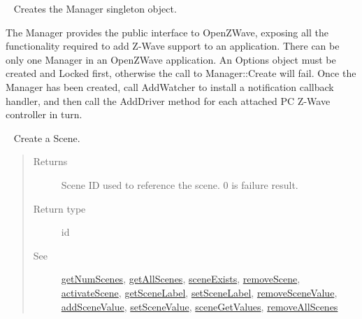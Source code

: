\documentclass[letterpaper,10pt,english]{sphinxmanual}
\begin{document}
\begin{fulllineitems}
\begin{fulllineitems}
\begin{quote}
\begin{description}
\end{description}\end{quote}

\end{fulllineitems}


\begin{fulllineitems}
\label{libopenzwave:libopenzwave.PyManager.create}~\label{libopenzwave:create}
Creates the Manager singleton object.

The Manager provides the public interface to OpenZWave, exposing all the
functionality required to add Z-Wave support to an application. There can be
only one Manager in an OpenZWave application.  An Options object must be
created and Locked first, otherwise the call to Manager::Create will fail.
Once the Manager has been created, call AddWatcher to install a notification
callback handler, and then call the AddDriver method for each attached PC
Z-Wave controller in turn.

\end{fulllineitems}


\begin{fulllineitems}
\label{libopenzwave:libopenzwave.PyManager.createScene}~\label{libopenzwave:createscene}
Create a Scene.
\begin{quote}\begin{description}
\item[{Returns}] \leavevmode
Scene ID used to reference the scene. 0 is failure result.

\item[{Return type}] \leavevmode
id

\item[{See}] \leavevmode
{\hyperref[libopenzwave:getnumscenes]{getNumScenes}}, {\hyperref[libopenzwave:getallscenes]{getAllScenes}}, {\hyperref[libopenzwave:sceneexists]{sceneExists}}, {\hyperref[libopenzwave:removescene]{removeScene}}, {\hyperref[libopenzwave:activatescene]{activateScene}}, {\hyperref[libopenzwave:getscenelabel]{getSceneLabel}}, {\hyperref[libopenzwave:setscenelabel]{setSceneLabel}}, {\hyperref[libopenzwave:removescenevalue]{removeSceneValue}}, {\hyperref[libopenzwave:addscenevalue]{addSceneValue}}, {\hyperref[libopenzwave:setscenevalue]{setSceneValue}}, {\hyperref[libopenzwave:scenegetvalues]{sceneGetValues}}, {\hyperref[libopenzwave:removeallscenes]{removeAllScenes}}


\end{description}
\end{quote}
\end{fulllineitems}
\end{fulllineitems}
\end{document}
